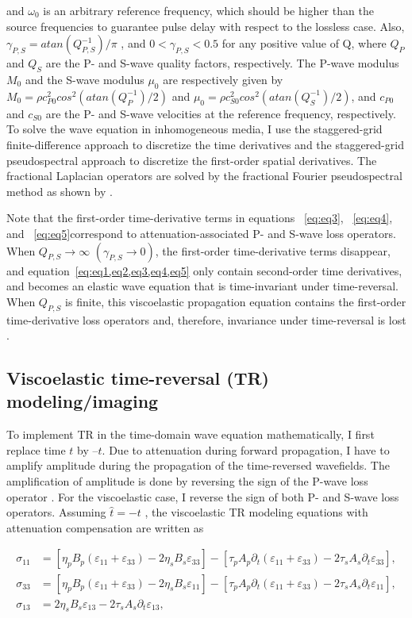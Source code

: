 and $\omega_0$ is an arbitrary reference frequency, which should be higher than the source frequencies to guarantee pulse delay with respect to the lossless case. Also, $\gamma_{P,S}=atan(Q_{P,S}^{-1})/\pi $ , and $0<\gamma_{P,S}<0.5$ for any positive value of Q, where  $Q_P$ and $Q_S$ are the P- and S-wave quality factors, respectively. The P-wave modulus  $M_0$ and the S-wave modulus $\mu_0$  are respectively given by $M_0=\rho c_{P0}^2cos^2(atan(Q_P^{-1})/2)$ and $\mu_0=\rho c_{S0}^2cos^2(atan(Q_S^{-1})/2)$, and $c_{P0}$  and $c_{S0}$   are the P- and S-wave velocities at the reference frequency, respectively. 
To solve the wave equation in inhomogeneous media, I use the staggered-grid finite-difference approach to discretize the time derivatives and the staggered-grid pseudospectral approach to discretize the first-order spatial derivatives. The fractional Laplacian operators are solved by the fractional Fourier pseudospectral method as shown by \cite[]{zhu14a}. 

Note that the first-order time-derivative terms in equations ~\ref{eq:eq3}, ~\ref{eq:eq4}, and ~\ref{eq:eq5}correspond to attenuation-associated P- and S-wave loss operators. When $Q_{P,S}\rightarrow \infty$   $(\gamma_{P,S}\rightarrow 0 )$, the first-order time-derivative terms disappear, and equation~\ref{eq:eq1,eq2,eq3,eq4,eq5} only contain second-order time derivatives, and becomes an elastic wave equation that is time-invariant under time-reversal. When $Q_{P,S}$  is finite, this viscoelastic propagation equation contains the first-order time-derivative loss operators and,  therefore, invariance under time-reversal is lost \cite[]{fink06}. 

\subsection{Viscoelastic time-reversal (TR) modeling/imaging}
To implement TR in the time-domain wave equation mathematically, I first replace time $t$ by $–t$. Due to attenuation during forward propagation, I have to amplify amplitude during the propagation of the time-reversed wavefields. The amplification of amplitude is done by reversing the sign of the P-wave loss operator \cite[]{zhu14b}. For the viscoelastic case, I reverse the sign of both P- and S-wave loss operators. Assuming $\hat{t}=-t$ , the viscoelastic TR modeling equations with attenuation compensation are written as

\begin{eqnarray}                   
\sigma _{11} &=\left [ \eta _pB_p(\varepsilon_{11}+\varepsilon_{33} )-2\eta _sB_s\varepsilon_{33}  \right ] - \left [ \tau _pA_p\partial _t (\varepsilon_{11}+\varepsilon_{33} )-2\tau _sA_s\partial _t \varepsilon_{33} \right ],\label{eq:eq9}\\        
\sigma _{33} &=\left [ \eta _pB_p(\varepsilon_{11}+\varepsilon_{33} )-2\eta _sB_s\varepsilon_{11}  \right ] - \left [ \tau _pA_p\partial _t (\varepsilon_{11}+\varepsilon_{33} )-2\tau _sA_s\partial _t \varepsilon_{11} \right ],\label{eq:eq10}\\
\sigma _{13} &=2\eta _sB_s\varepsilon_{13} - 2\tau _sA_s\partial _t \varepsilon_{13},\label{eq:eq11}
\end{eqnarray}

